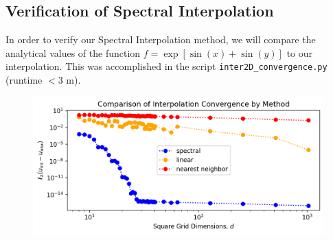 \documentclass[12pt, reqno]{amsart}
\begin{document}
\subsection{Verification of Spectral Interpolation}
In order to verify our Spectral Interpolation method, we will compare the analytical values of the function $f = \exp [ \sin(x) + \sin(y)]$ to our interpolation. This was accomplished in the script \texttt{inter2D\_convergence.py} (runtime $<3$ m).

\begin{figure}[H]
    \centering
    \includegraphics[width = 1\linewidth]{Comparison of Interpolation Convergence by Method.png}
\end{figure}
\end{document}

